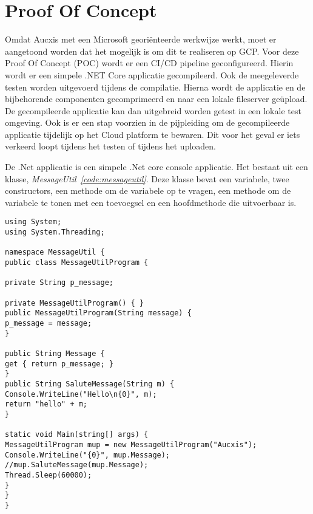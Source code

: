 \chapter{Proof Of Concept}
\label{ch:poc}
Omdat Aucxis met een Microsoft georiënteerde werkwijze werkt, moet er aangetoond worden dat het mogelijk is om dit te realiseren op GCP. Voor deze Proof Of Concept (POC) wordt er een CI/CD pipeline geconfigureerd. Hierin wordt er een simpele .NET Core applicatie gecompileerd. Ook de meegeleverde testen worden uitgevoerd tijdens de compilatie. Hierna wordt de applicatie en de bijbehorende componenten gecomprimeerd en naar een lokale fileserver geüpload. De gecompileerde applicatie kan dan uitgebreid worden getest in een lokale test omgeving. Ook is er een stap voorzien in de pijpleiding om de gecompileerde applicatie tijdelijk op het Cloud platform te bewaren. Dit voor het geval er iets verkeerd loopt tijdens het testen of tijdens het uploaden.

De .Net applicatie is een simpele .Net core console applicatie. Het bestaat uit een klasse, \emph{MessageUtil~\ref{code:messageutil}}. Deze klasse bevat een variabele, twee constructors, een methode om de variabele op te vragen, een methode om de variabele te tonen met een toevoegsel en een hoofdmethode die uitvoerbaar is.

\begin{lstlisting}
using System;
using System.Threading;

namespace MessageUtil {
public class MessageUtilProgram {

private String p_message;

private MessageUtilProgram() { }
public MessageUtilProgram(String message) {
p_message = message;
}

public String Message {
get { return p_message; }
}
public String SaluteMessage(String m) {
Console.WriteLine("Hello\n{0}", m);
return "hello" + m;
}

static void Main(string[] args) {
MessageUtilProgram mup = new MessageUtilProgram("Aucxis");
Console.WriteLine("{0}", mup.Message);
//mup.SaluteMessage(mup.Message);
Thread.Sleep(60000);
}
}
}
\end{lstlisting}

